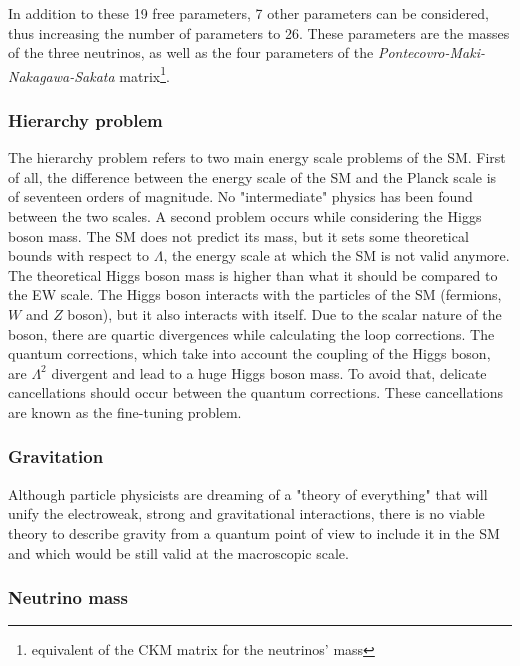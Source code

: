       In addition to these 19 free parameters, 7 other parameters can be considered, thus increasing the number of parameters to 26.
      These parameters are the masses of the three neutrinos, as well as the four parameters of the \textit{Pontecovro-Maki-Nakagawa-Sakata} matrix\footnote{equivalent of the CKM matrix for the neutrinos' mass}.
    
      \subsubsection{Hierarchy problem}


      The hierarchy problem refers to two main energy scale problems of the \gls{SM}.
      First of all, the difference between the energy scale of the \gls{SM} and the Planck scale is of seventeen orders of magnitude.
      No "intermediate" physics has been found between the two scales.
      A second problem occurs while considering the Higgs boson mass.
      The \gls{SM} does not predict its mass, but it sets some theoretical bounds with respect to $\Lambda$, the energy scale at which the \gls{SM} is not valid anymore.
      The theoretical Higgs boson mass is higher than what it should be compared to the EW scale.
      The Higgs boson interacts with the particles of the \gls{SM} (fermions, $W$ and $Z$ boson), but it also interacts with itself.
      Due to the scalar nature of the boson, there are quartic divergences while calculating the loop corrections.
      The quantum corrections, which take into account the coupling of the Higgs boson, are $\Lambda^2$ divergent and lead to a huge Higgs boson mass.
      To avoid that, delicate cancellations should occur between the quantum corrections.
      These cancellations are known as the fine-tuning problem. 
      
      \subsubsection{Gravitation}

      Although particle physicists are dreaming of a "theory of everything" that will unify the electroweak, strong and gravitational interactions, there is no viable theory to describe gravity from a quantum point of view to include it in the \gls{SM} and which would be still valid at the macroscopic scale.

      \subsubsection{Neutrino mass}

